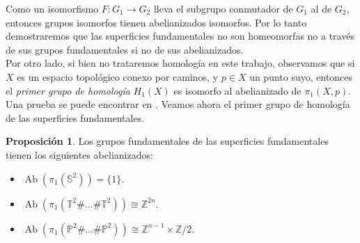 \documentclass[10pt]{report}
\DeclareMathOperator{\Ab}{Ab}
\newcommand{\Esfera}{\mathbb{S}^2}
\newcommand{\Toro}{\mathbb{T}^2}
\newcommand{\Proyectivo}{\mathbb{P}^2}
\theoremstyle{definition}
\newtheorem{prop}[defin]{Proposición}
\begin{document}
Como un isomorfismo $F:G_1 \to G_2$ lleva el subgrupo conmutador de $G_1$ al de $G_2$, entonces grupos isomorfos tienen abelianizados isomorfos. Por lo tanto demostraremos que las superficies fundamentales no son homeomorfas no a través de sus grupos fundamentales si no de sus abelianizados.\\
Por otro lado, si bien no trataremos homología en este trabajo, observamos que si $X$ es un espacio topológico conexo por caminos, y $p\in X$ un punto suyo, entonces el \textit{primer grupo de homología} $H_1(X)$ es isomorfo al abelianizado de $\pi_1(X,p)$. Una prueba se puede encontrar en \cite{lee1}. Veamos ahora el primer grupo de homología de las superficies fundamentales.


\begin{prop}
Los grupos fundamentales de las superficies fundamentales tienen los siguientes abelianizados:
\begin{itemize}
\item $\Ab{(\pi_1 (\Esfera ))} = \{ 1 \}$.
\item $\Ab{(\pi_1 (\Toro \# \dots \# \Toro ))} \cong \mathbb{Z}^{2n}$.
\item $\Ab{(\pi_1 (\Proyectivo \# \dots \# \Proyectivo ))} \cong \mathbb{Z}^{n-1} \times \mathbb{Z}/2$.
\end{itemize}
\end{prop}
\end{document}

